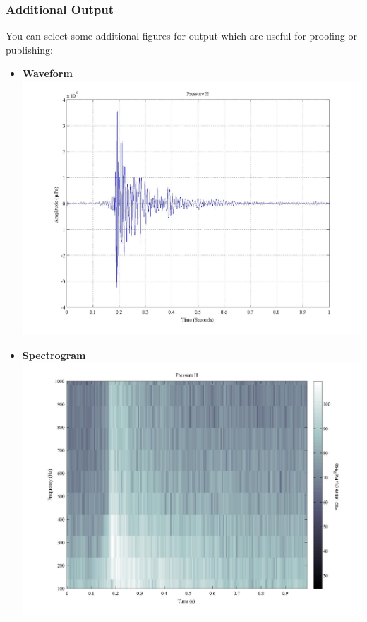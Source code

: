 \documentclass[11pt]{report}
\begin{document}
\subsubsection{Additional Output}
You can select some additional figures for output which are useful for proofing or publishing:
\begin{itemize}
	\item  \textbf{Waveform}\\
		\includegraphics[width = \textwidth ]{11.jpeg}
	\item  \textbf{Spectrogram}\\
		\includegraphics[width = \textwidth ]{10.jpeg}
\end{itemize}
\end{document}
